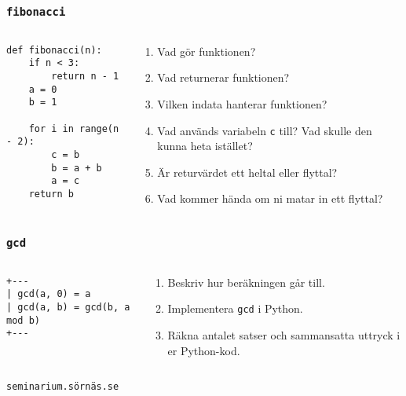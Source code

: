 \documentclass{beamer}
\begin{document}
  \begin{frame}[fragile]
    \frametitle{\texttt{fibonacci}}

    \begin{columns}
      \begin{column}{0.48\textwidth}
        \begin{verbatim}
def fibonacci(n):
    if n < 3:
        return n - 1
    a = 0
    b = 1

    for i in range(n - 2):
        c = b
        b = a + b
        a = c
    return b
        \end{verbatim}
      \end{column}%
      \begin{column}{0.48\textwidth}
        \begin{enumerate}
          \item Vad gör funktionen?
          \item Vad returnerar funktionen?
          \item Vilken indata hanterar funktionen?
          \item Vad används variabeln \texttt{c} till? Vad skulle den kunna heta istället?
          \item Är returvärdet ett heltal eller flyttal?
          \item Vad kommer hända om ni matar in ett flyttal?
        \end{enumerate}
      \end{column}%
    \end{columns}
  \end{frame}

  \begin{frame}[fragile]
    \frametitle{\texttt{gcd}}
    \begin{columns}
      \begin{column}{0.48\textwidth}
        \begin{verbatim}
+---
| gcd(a, 0) = a
| gcd(a, b) = gcd(b, a mod b)
+---
        \end{verbatim}
      \end{column}%
      \begin{column}{0.48\textwidth}
        \begin{enumerate}
          \item Beskriv hur beräkningen går till.
          \item Implementera \texttt{gcd} i Python.
          \item Räkna antalet satser och sammansatta uttryck i er Python-kod.
        \end{enumerate}
      \end{column}%
    \end{columns}

    \vfill{}
    \hfill{} \texttt{seminarium.sörnäs.se} \\
  \end{frame}
\end{document}
